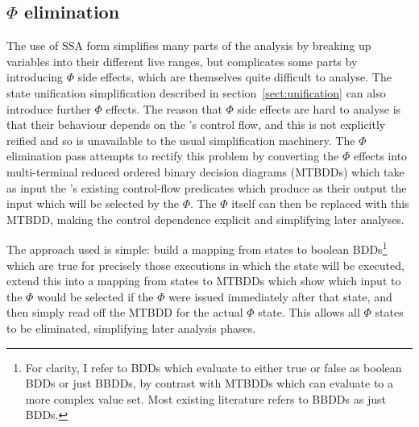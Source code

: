 \subsection{$\Phi$ elimination}
\label{sect:phi_elimination}

The use of SSA form simplifies many parts of the analysis by breaking
up variables into their different live ranges, but complicates some
parts by introducing $\Phi$ side effects, which are themselves quite
difficult to analyse.  The state unification simplification described
in section~\ref{sect:unification} can also introduce further $\Phi$
effects.  The reason that $\Phi$ side effects are hard to analyse is
that their behaviour depends on the {\StateMachine}'s control flow,
and this is not explicitly reified and so is unavailable to the usual
simplification machinery.  The $\Phi$ elimination pass attempts to
rectify this problem by converting the $\Phi$ effects into
multi-terminal reduced ordered binary decision diagrams\needCite{}
(MTBDDs) which take as input the {\StateMachine}'s existing
control-flow predicates which produce as their output the input which
will be selected by the $\Phi$.  The $\Phi$ itself can then be
replaced with this MTBDD, making the control dependence explicit and
simplifying later analyses.




The approach used is simple: build a mapping from {\StateMachine}
states to boolean BDDs\footnote{For clarity, I refer to BDDs which
  evaluate to either true or false as boolean BDDs or just BBDDs, by
  contrast with MTBDDs which can evaluate to a more complex value set.
  Most existing literature refers to BBDDs as just BDDs.}  which are
true for precisely those executions in which the state will be
executed, extend this into a mapping from states to MTBDDs which show
which input to the $\Phi$ would be selected if the $\Phi$ were issued
immediately after that state, and then simply read off the MTBDD for
the actual $\Phi$ state.  This allows all $\Phi$ states to be
eliminated, simplifying later
analysis phases.

